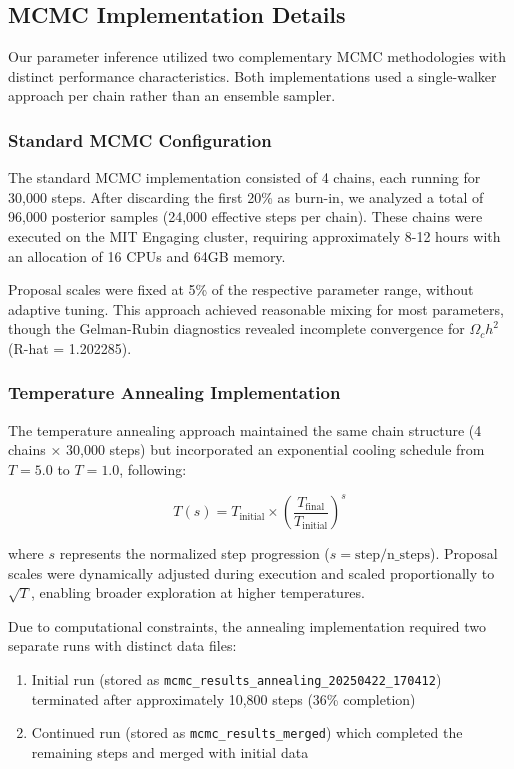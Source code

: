 \documentclass[11pt]{article}
\theoremstyle{definition}
\begin{document}
\subsection{MCMC Implementation Details}

Our parameter inference utilized two complementary MCMC methodologies with distinct performance characteristics. Both implementations used a single-walker approach per chain rather than an ensemble sampler.

\subsubsection{Standard MCMC Configuration}

The standard MCMC implementation consisted of 4 chains, each running for 30,000 steps. After discarding the first 20\% as burn-in, we analyzed a total of 96,000 posterior samples (24,000 effective steps per chain). These chains were executed on the MIT Engaging cluster, requiring approximately 8-12 hours with an allocation of 16 CPUs and 64GB memory.

Proposal scales were fixed at 5\% of the respective parameter range, without adaptive tuning. This approach achieved reasonable mixing for most parameters, though the Gelman-Rubin diagnostics revealed incomplete convergence for $\Omega_c h^2$ (R-hat = 1.202285).

\subsubsection{Temperature Annealing Implementation}

The temperature annealing approach maintained the same chain structure (4 chains × 30,000 steps) but incorporated an exponential cooling schedule from $T=5.0$ to $T=1.0$, following:

\begin{equation}
T(s) = T_{\text{initial}} \times \left(\frac{T_{\text{final}}}{T_{\text{initial}}}\right)^{s}
\end{equation}

where $s$ represents the normalized step progression ($s = \text{step}/\text{n\_steps}$). Proposal scales were dynamically adjusted during execution and scaled proportionally to $\sqrt{T}$, enabling broader exploration at higher temperatures.

Due to computational constraints, the annealing implementation required two separate runs with distinct data files:
\begin{enumerate}
    \item Initial run (stored as \texttt{mcmc\_results\_annealing\_20250422\_170412}) terminated after approximately 10,800 steps (36\% completion)
    \item Continued run (stored as \texttt{mcmc\_results\_merged}) which completed the remaining steps and merged with initial data
\end{enumerate}
\end{document}
